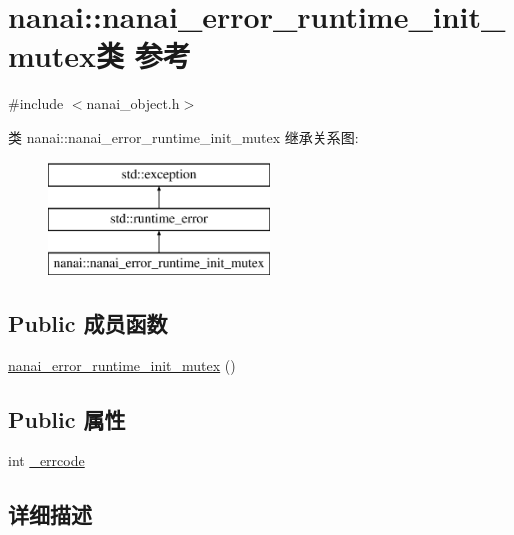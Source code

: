 \hypertarget{classnanai_1_1nanai__error__runtime__init__mutex}{}\section{nanai\+:\+:nanai\+\_\+error\+\_\+runtime\+\_\+init\+\_\+mutex类 参考}
\label{classnanai_1_1nanai__error__runtime__init__mutex}


{\ttfamily \#include $<$nanai\+\_\+object.\+h$>$}

类 nanai\+:\+:nanai\+\_\+error\+\_\+runtime\+\_\+init\+\_\+mutex 继承关系图\+:\begin{figure}[H]
\begin{center}
\leavevmode
\includegraphics[height=3.000000cm]{classnanai_1_1nanai__error__runtime__init__mutex}
\end{center}
\end{figure}
\subsection*{Public 成员函数}
\begin{DoxyCompactItemize}
\item 
\hyperlink{classnanai_1_1nanai__error__runtime__init__mutex_a0013394fd311166a8407be53eba690a6}{nanai\+\_\+error\+\_\+runtime\+\_\+init\+\_\+mutex} ()
\end{DoxyCompactItemize}
\subsection*{Public 属性}
\begin{DoxyCompactItemize}
\item 
int \hyperlink{classnanai_1_1nanai__error__runtime__init__mutex_a9cf39ee56a510b20711a828030b72c96}{\+\_\+errcode}
\end{DoxyCompactItemize}


\subsection{详细描述}


